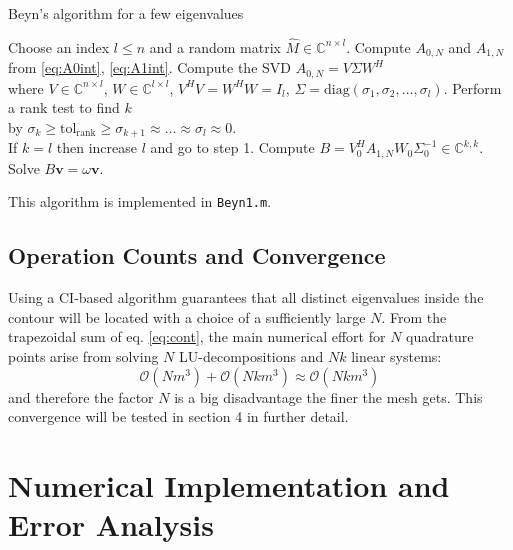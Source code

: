 \documentclass[final,leqno,onefignum,onetabnum]{siamltex1213}
\begin{document}
\begin{algorithm}
\caption{Beyn's algorithm for a few eigenvalues}
\label{alg:Beyn1}
\begin{algorithmic}
\REQUIRE Choose an index $l\leq n$ and a random matrix $\hat{M}\in\mathbb{C}^{n\times l}$. 
\STATE Compute $A_{0,N}$ and $A_{1,N}$ from \ref{eq:A0int}, \ref{eq:A1int}. 
\STATE Compute the SVD $A_{0,N} = V\Sigma W^{H}$ 
\\ \hspace{0.5cm} where $V\in\mathbb{C}^{n\times l}$, $W\in\mathbb{C}^{l\times l}$, $V^{H}V=W^{H}W = I_{l}$, $\Sigma = \mathrm{diag}(\sigma_1,\sigma_2,\ldots,\sigma_l)$.
\STATE Perform a rank test to find $k$ 
\\ \hspace{0.5cm} by $\sigma_k \geq \mathrm{tol_{rank}}\geq \sigma_{k+1} \approx \ldots \approx \sigma_l \approx 0$. 
\\ \hspace{0.5cm} If $k = l$ then increase $l$ and go to step 1. 
\STATE Compute $B = V_0^H A_{1,N} W_0 \Sigma_0^{-1} \in \mathbb{C}^{k,k}$.
\STATE Solve $B\mathbf{v} =\omega\mathbf{v}$.
\end{algorithmic}
\end{algorithm}
This algorithm is implemented in {\tt Beyn1.m}. 

\subsection{Operation Counts and Convergence}
Using a CI-based algorithm guarantees that all distinct eigenvalues inside the contour will be located with a choice of a sufficiently large $N$. From the trapezoidal sum of eq. \ref{eq:cont}, the main numerical effort for $N$ quadrature points arise from solving $N$ LU-decompositions and $Nk$ linear systems:
\begin{equation}
\mathcal{O}(N m^3) + \mathcal{O}(N k m^3)\approx \mathcal{O}(Nkm^3) 
\end{equation}
and therefore the factor $N$ is a big disadvantage the finer the mesh gets. This convergence will be tested in section 4 in further detail. 
\section{Numerical Implementation and Error Analysis }
\end{document}
